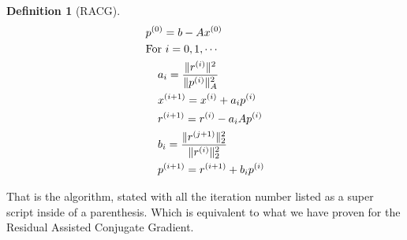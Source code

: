 \documentclass[]{article}
\theoremstyle{definition}
\newtheorem{definition}{Definition}
\begin{document}
            \begin{definition}[RACG]\label{def:RACG}
                \begin{align}
                    & p^{(0)} = b - Ax^{(0)} 
                    \\&
                    \text{For } i = 0,1, \cdots
                    \\&\hspace{1.1em}
                    \begin{aligned}
                        & a_{i} = \frac{\Vert r^{(i)}\Vert^2}{\Vert p^{(i)}\Vert^2_A}
                        \\
                        & x^{(i + 1)} = x^{(i)} + a_i p^{(i)}
                        \\
                        & r^{(i + 1)} = r^{(i)} - a_iAp^{(i)}
                        \\
                        & b_{i} = \frac{\Vert r^{(j + 1)}\Vert_2^2}{\Vert r^{(i)}\Vert_2^2}
                        \\
                        & p^{(i + 1)} = r^{(i + 1)} + b_{i}p^{(i)}
                    \end{aligned}
                \end{align}
            \end{definition}
            That is the algorithm, stated with all the iteration number listed as a super script inside of a parenthesis. Which is equivalent to what we have proven for the Residual Assisted Conjugate Gradient. 
\end{document}
